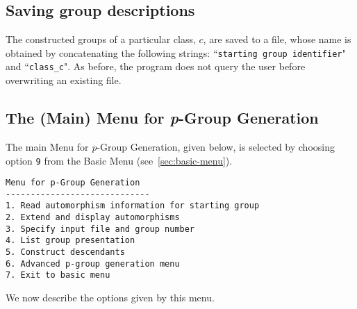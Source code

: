 \documentclass[12pt]{article}
\begin{document}
\subsection{Saving group descriptions}
The constructed groups of a particular class, $c$, are saved to a file,
whose name is obtained by concatenating the following strings:
``\texttt{starting group identifier}" and ``\texttt{class\_c}". As before, the 
program does not query the user before overwriting an existing file.

\subsection{The (Main) Menu for {\it p}-Group Generation}
\label{sec:pgrp-gen-main-menu}
The main Menu for {\it p}-Group Generation, given below, is selected by
choosing option \texttt{9} from the Basic Menu (see~\ref{sec:basic-menu}).
\enlargethispage*{1\baselineskip}
\begin{verbatim}
Menu for p-Group Generation
-----------------------------
1. Read automorphism information for starting group
2. Extend and display automorphisms
3. Specify input file and group number
4. List group presentation
5. Construct descendants
6. Advanced p-group generation menu
7. Exit to basic menu
\end{verbatim}

We now describe the options given by this menu.
\end{document}
